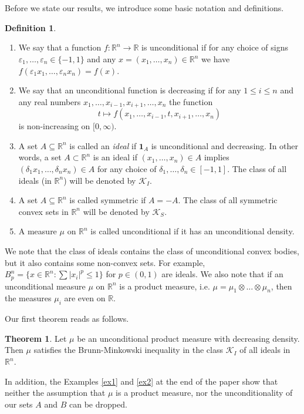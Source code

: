 \documentclass[11pt]{article}
\newcommand{\mb}[1]{\mathbb{{#1}}}
\newcommand{\mc}[1]{\mathcal{{#1}}}
\newcommand{\1}{\mathbf{{1}}}
\newcommand{\e}{\varepsilon}
\theoremstyle{definition}
\newtheorem{thm}{Theorem}
\newtheorem{defi}{Definition}
\begin{document}
\noindent Before we state our results, we introduce some basic notation and definitions.
\begin{defi}\label{df}  $\frac{}{}$

\begin{enumerate}
\item We say that a function $f:\mb{R}^n \to \mb{R}$ is unconditional if for any choice of signs $\e_1,\ldots,\e_n \in \{-1,1\}$ and any $x =(x_1,\ldots,x_n)\in \mb{R}^n$ we have $f(\e_1x_1,\ldots,\e_n x_n)=f(x)$.
\item We say that an unconditional function is decreasing if for any $1 \leq i \leq n$ and any real numbers $x_1,\ldots,x_{i-1},x_{i+1},\ldots,x_n$ the function $$t \mapsto f(x_1,\ldots,x_{i-1},t,x_{i+1},\ldots,x_n)$$ is non-increasing on $[0,\infty)$.
\item A set $A \subseteq \mb{R}^n$ is called an \emph{ideal} if $\1_A$ is unconditional and decreasing. In other words, a set $A\subset \mb{R}^n$ is an ideal if $(x_1,\ldots,x_n)\in A$ implies $(\delta_1x_1,\ldots,\delta_nx_n) \in A$ for any choice of  $\delta_1,\ldots,\delta_n \in [-1,1]$.  The class of all ideals (in $\mb{R}^n$) will be denoted by $\mc{K}_I$.
\item A set $A \subseteq \mb{R}^n$ is called symmetric if $A=-A$. The class of all symmetric convex sets in $\mb{R}^n$ will be denoted by $\mc{K}_S$.
\item A measure $\mu$ on $\mb{R}^n$ is called unconditional  if it has an unconditional  density.
\end{enumerate}
\end{defi}

We note that the class of ideals contains the class of unconditional convex bodies, but it also contains some non-convex sets. For example,  $B_p^n=\{ x\in \mb{R}^n: \sum|x_i|^p \le 1\}$ for $p\in (0,1)$ are ideals.  We also note that if an unconditional  measure $\mu$ on $\mb{R}^n$ is a product measure, i.e. $\mu=\mu_1 \otimes \ldots \otimes \mu_n$, then the measures $\mu_i$ are even  on $\mb{R}$.

Our first theorem reads as follows.


\begin{thm}\label{BMgen}
Let $\mu$ be an unconditional product measure with decreasing density. Then $\mu$ satisfies the Brunn-Minkowski inequality in the class $\mc{K}_I$ of all ideals in $\mb{R}^n$.
\end{thm}

In addition, the Examples \ref{ex1} and  \ref{ex2} at the end of the paper show that  neither the assumption that $\mu$ is a product measure, nor the unconditionality of our sets $A$ and $B$ can be dropped.
\end{document}
